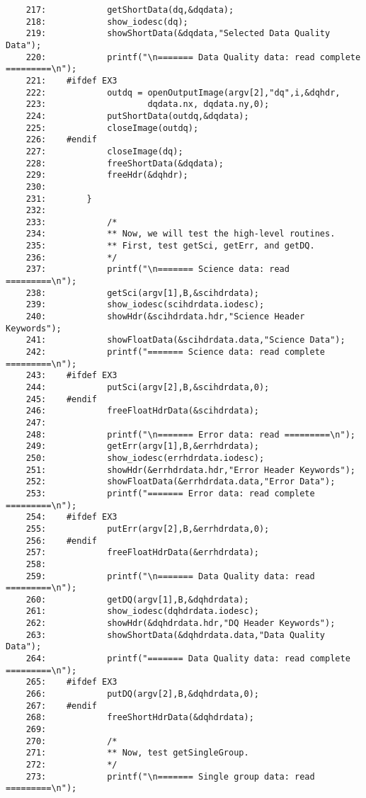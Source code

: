 \begin{scriptsize}
\begin{verbatim}
    217:            getShortData(dq,&dqdata);
    218:            show_iodesc(dq);
    219:            showShortData(&dqdata,"Selected Data Quality Data");
    220:            printf("\n======= Data Quality data: read complete =========\n");
    221:    #ifdef EX3
    222:            outdq = openOutputImage(argv[2],"dq",i,&dqhdr, 
    223:                    dqdata.nx, dqdata.ny,0);
    224:            putShortData(outdq,&dqdata);
    225:            closeImage(outdq);
    226:    #endif
    227:            closeImage(dq);
    228:            freeShortData(&dqdata);
    229:            freeHdr(&dqhdr);
    230:    
    231:        }
    232:    
    233:            /*
    234:            ** Now, we will test the high-level routines.
    235:            ** First, test getSci, getErr, and getDQ.
    236:            */
    237:            printf("\n======= Science data: read =========\n");
    238:            getSci(argv[1],B,&scihdrdata);
    239:            show_iodesc(scihdrdata.iodesc);
    240:            showHdr(&scihdrdata.hdr,"Science Header Keywords");
    241:            showFloatData(&scihdrdata.data,"Science Data");
    242:            printf("======= Science data: read complete =========\n");
    243:    #ifdef EX3
    244:            putSci(argv[2],B,&scihdrdata,0);
    245:    #endif
    246:            freeFloatHdrData(&scihdrdata);
    247:    
    248:            printf("\n======= Error data: read =========\n");
    249:            getErr(argv[1],B,&errhdrdata);
    250:            show_iodesc(errhdrdata.iodesc);
    251:            showHdr(&errhdrdata.hdr,"Error Header Keywords");
    252:            showFloatData(&errhdrdata.data,"Error Data");
    253:            printf("======= Error data: read complete =========\n");
    254:    #ifdef EX3
    255:            putErr(argv[2],B,&errhdrdata,0);
    256:    #endif
    257:            freeFloatHdrData(&errhdrdata);
    258:    
    259:            printf("\n======= Data Quality data: read =========\n");
    260:            getDQ(argv[1],B,&dqhdrdata);
    261:            show_iodesc(dqhdrdata.iodesc);
    262:            showHdr(&dqhdrdata.hdr,"DQ Header Keywords");
    263:            showShortData(&dqhdrdata.data,"Data Quality Data");
    264:            printf("======= Data Quality data: read complete =========\n");
    265:    #ifdef EX3
    266:            putDQ(argv[2],B,&dqhdrdata,0);
    267:    #endif
    268:            freeShortHdrData(&dqhdrdata);
    269:    
    270:            /*
    271:            ** Now, test getSingleGroup.
    272:            */
    273:            printf("\n======= Single group data: read =========\n");

\end{verbatim}
\end{scriptsize}
